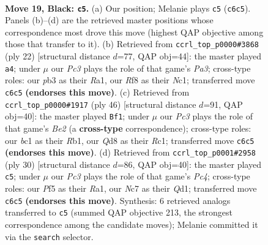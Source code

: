 \documentclass[11pt]{article}
\begin{document}
\begin{figure}[p]
\label{fig:thought-m35}
\end{figure}

\clearpage

\begin{figure}[p]\centering
\begin{subfigure}{0.46\textwidth}\centering
\resizebox{\linewidth}{!}{%
\newchessgame
\chessboard[
  setfen={1rbq1r1k/p1n1b2p/1pp3p1/3p1p1n/P2P1P2/1P3NP1/Q2NP1BP/R1B1R1K1 b - - 0 19},
  showmover=false,
  pgfstyle=straightmove, color=movearrow, markmove={c6-c5}
]}
\caption{}
\end{subfigure}\hfill
\begin{subfigure}{0.46\textwidth}\centering
\resizebox{\linewidth}{!}{%
\newchessgame
\chessboard[
  setfen={r1b1k2r/2qnbpp1/p1p2n2/1p2p2p/4P3/P1N1BP2/1PP2QPP/R1N1KB1R w KQkq - 2 12},
  showmover=false,
  pgfstyle=straightmove, color=movearrow, markmove={a3-a4}
]}
\caption{}
\end{subfigure}
\\[4pt]
\begin{subfigure}{0.46\textwidth}\centering
\resizebox{\linewidth}{!}{%
\newchessgame
\chessboard[
  setfen={r6k/1p2q1p1/3pbrnp/1P1npp2/p7/P2PPN1P/2Q1BPP1/1RR1B1K1 w - - 3 24},
  showmover=false,
  pgfstyle=straightmove, color=movearrow, markmove={e2-f1}
]}
\caption{}
\end{subfigure}\hfill
\begin{subfigure}{0.46\textwidth}\centering
\resizebox{\linewidth}{!}{%
\newchessgame
\chessboard[
  setfen={r2qr1k1/1p1nbp2/3p1np1/p2Pp2p/P1P5/1N2BP2/1P2B1PP/R2Q1R1K w - - 1 16},
  showmover=false,
  pgfstyle=straightmove, color=movearrow, markmove={c4-c5}
]}
\caption{}
\end{subfigure}
\caption{\textbf{Move 19, Black: \texttt{c5}.} (a) Our position; Melanie plays \texttt{c5} (\texttt{c6c5}). Panels (b)--(d) are the retrieved master positions whose correspondence most drove this move (highest QAP objective among those that transfer to it). (b) Retrieved from \texttt{ccrl\_top\_p0000\#3868} (ply 22) [structural distance $d$=77, QAP obj=44]: the master played \texttt{a4}; under $\mu$ our \emph{Pc3} plays the role of that game's \emph{Pa3}; cross-type roles: our \emph{p}b3 as their \emph{R}a1, our \emph{R}f8 as their \emph{N}c1; transferred move \texttt{c6c5} \textbf{(endorses this move)}. (c) Retrieved from \texttt{ccrl\_top\_p0000\#1917} (ply 46) [structural distance $d$=91, QAP obj=40]: the master played \texttt{Bf1}; under $\mu$ our \emph{Pc3} plays the role of that game's \emph{Be2} (a \textbf{cross-type} correspondence); cross-type roles: our \emph{b}c1 as their \emph{R}b1, our \emph{Q}d8 as their \emph{R}c1; transferred move \texttt{c6c5} \textbf{(endorses this move)}. (d) Retrieved from \texttt{ccrl\_top\_p0001\#2958} (ply 30) [structural distance $d$=86, QAP obj=40]: the master played \texttt{c5}; under $\mu$ our \emph{Pc3} plays the role of that game's \emph{Pc4}; cross-type roles: our \emph{P}f5 as their \emph{R}a1, our \emph{N}c7 as their \emph{Q}d1; transferred move \texttt{c6c5} \textbf{(endorses this move)}. Synthesis: 6 retrieved analogs transferred to \texttt{c5} (summed QAP objective 213, the strongest correspondence among the candidate moves); Melanie committed it via the \texttt{search} selector.}

\end{figure}
\end{document}
